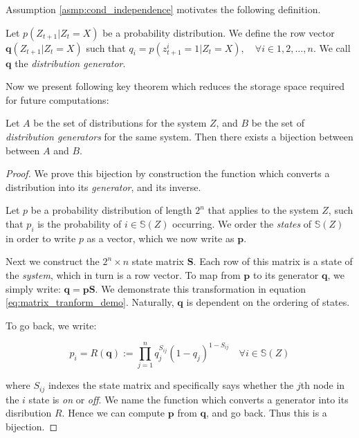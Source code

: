 Assumption \ref{asmp:cond_independence} motivates the following definition.

\begin{definition}
	\label{def:generator}
	Let $p(Z_{t+1}|Z_t = X)$ be a probability distribution. We define the row vector $\mathbf{q}(Z_{t+1}|Z_t = X)$ such that $q_i = p(z^i_{t+1}=1|Z_t=X), \quad \forall i \in 1, 2, \ldots, n$. We call $\mathbf{q}$ the \textit{distribution generator}.
\end{definition}

Now we present following key theorem which reduces the storage space required for future computations:

\begin{theorem}
	\label{thm:bijection}
	Let $A$ be the set of distributions for the system $Z$, and $B$ be the set of \textit{distribution generators} for the same system. Then there exists a bijection between between $A$ and $B$.
\end{theorem}

\begin{proof}
	We prove this bijection by construction the function which converts a distribution into its \textit{generator}, and its inverse.
	
	Let $p$ be a probability distribution of length $2^n$ that applies to the system $Z$, such that $p_i$ is the probability of $i \in \mathbb{S}(Z)$ occurring. We order the \textit{states} of $\mathbb{S}(Z)$ in order to write $p$ as a vector, which we now write as $\mathbf{p}$. 
	
	Next we construct the $2^n \times n$ state matrix $\mathbf{S}$. Each row of this matrix is a state of the \textit{system}, which in turn is a row vector. To map from $\mathbf{p}$ to its generator $\mathbf{q}$, we simply write: $\mathbf{q} = \mathbf{p} \mathbf{S}$. We demonstrate this transformation in equation \ref{eq:matrix_tranform_demo}. Naturally, $\mathbf{q}$ is dependent on the ordering of states.
	
	To go back, we write:
	
	\begin{equation}
	\label{eq:map_inv}
	p_i = R(\mathbf{q}) := \prod \limits_{j=1}^{n} q_j^{S_{ij}} (1-q_j)^{1-S_{ij}}\quad \forall i \in \mathbb{S}(Z)
	\end{equation}
	
	where  $S_{ij}$  indexes the state matrix and specifically says whether the $j$th node in the $i$ state is \textit{on} or \textit{off}. We name the function which converts a generator into its disribution $R$. Hence we can compute $\mathbf{p}$ from $\mathbf{q}$, and go back. Thus this is a bijection.
\end{proof}

